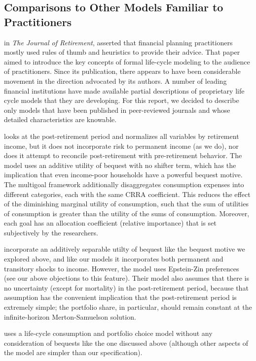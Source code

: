 \documentclass{article}
\begin{document}
\subsection{Comparisons to Other Models Familiar to Practitioners}

\cite{Gordon_2014} in \textit{The Journal of Retirement}, asserted that financial planning practitioners mostly used rules of thumb and heuristics to provide their advice.
That paper aimed to introduce the key concepts of formal life-cycle modeling to the audience of practitioners.
Since its publication, there appears to have been considerable movement in the direction advocated by its authors.
A number of leading financial institutions have made available partial descriptions of proprietary life cycle models that they are developing.
For this report, we decided to describe only models that have been published in peer-reviewed journals and whose detailed characteristics are knowable.

\cite{Daga_2023} looks at the post-retirement period and normalizes all variables by retirement income, but it does not incorporate risk to permanent income (as we do), nor does it attempt to reconcile post-retirement with pre-retirement behavior.
The model uses an additive utility of bequest with no shifter term, which has the implication that even income-poor households have a powerful bequest motive.
The multigoal framework additionally disaggregates consumption expenses into different categories, each with the same CRRA coefficient.
This reduces the effect of the diminishing marginal utility of consumption, such that the sum of utilities of consumption is greater than the utility of the sums of consumption.
Moreover, each goal has an allocation coefficient (relative importance) that is set subjectively by the researchers.

\cite{O_Hara_2015} incorporate an additively separable utilty of bequest like the bequest motive we explored above, and like our models it incorporates both permanent and transitory shocks to income.
However, the model uses Epstein-Zin preferences (see our above objections to this feature).
Their model also assumes that there is no uncertainty (except for mortality) in the post-retirement period, because that assumption has the convenient implication that the post-retirement period is extremely simple; the portfolio share, in particular, should remain constant at the infinite-horizon Merton-Samuelson solution.

\cite{Lanski_2022} uses a life-cycle consumption and portfolio choice model without any consideration of bequests like the one discussed above (although other aspects of the model are simpler than our specification).
\end{document}
